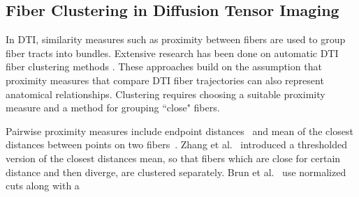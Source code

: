 \subsection {Fiber Clustering in Diffusion Tensor Imaging}
\label {subsec:fiberClus}
In DTI, similarity measures such as proximity between fibers are used to group fiber tracts into bundles. Extensive research has been done on automatic DTI fiber clustering methods \cite{Brun2004,Brun2003,Corouge2004,westinMEDIA02,Zhang2008}. These approaches build on the assumption that proximity measures that compare DTI fiber trajectories can also represent anatomical relationships.
Clustering requires choosing a suitable proximity measure and a method for grouping ``close" fibers.

Pairwise proximity measures include endpoint distances~\cite{Brun2003} and mean of the closest distances between points on two fibers~\cite{Corouge2004}. Zhang et al.~\cite{Zhang2008} introduced a thresholded version of the closest distances mean, so that fibers which are close for certain distance and then diverge, are clustered separately. Brun et al.~\cite{Brun2004} use normalized cuts along with a  

